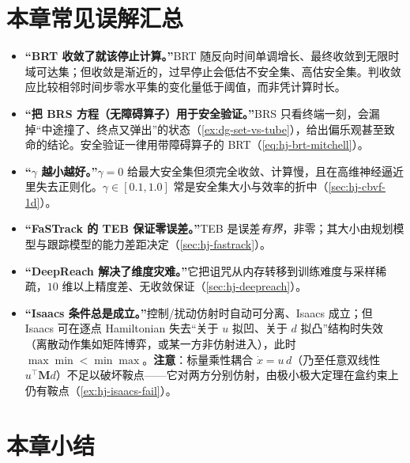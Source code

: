 \section*{本章常见误解汇总}

\begin{itemize}
  \item \textbf{“BRT 收敛了就该停止计算。”}\;BRT 随反向时间单调增长、最终收敛到无限时域可达集；但收敛是渐近的，过早停止会低估不安全集、高估安全集。判收敛应比较相邻时间步零水平集的变化量低于阈值，而非凭计算时长。
  \item \textbf{“把 BRS 方程（无障碍算子）用于安全验证。”}\;BRS 只看终端一刻，会漏掉“中途撞了、终点又弹出”的状态（\cref{ex:dg-set-vs-tube}），给出偏乐观甚至致命的结论。安全验证一律用带障碍算子的 BRT（\cref{eq:hj-brt-mitchell}）。
  \item \textbf{“$\gamma$ 越小越好。”}\;$\gamma=0$ 给最大安全集但须完全收敛、计算慢，且在高维神经逼近里失去正则化。$\gamma\in[0.1,1.0]$ 常是安全集大小与效率的折中（\cref{sec:hj-cbvf-1d}）。
  \item \textbf{“FaSTrack 的 TEB 保证零误差。”}\;TEB 是误差\emph{有界}，非零；其大小由规划模型与跟踪模型的能力差距决定（\cref{sec:hj-fastrack}）。
  \item \textbf{“DeepReach 解决了维度灾难。”}\;它把诅咒从内存转移到训练难度与采样稀疏，$10$ 维以上精度差、无收敛保证（\cref{sec:hj-deepreach}）。
  \item \textbf{“Isaacs 条件总是成立。”}\;控制/扰动仿射时自动可分离、Isaacs 成立；但 Isaacs 可在逐点 Hamiltonian 失去“关于 $u$ 拟凹、关于 $d$ 拟凸”结构时失效（离散动作集如矩阵博弈，或某一方非仿射进入），此时 $\max\min<\min\max$。\textbf{注意}：标量乘性耦合 $\dot x=u\,d$（乃至任意双线性 $u^\top\mathbf M d$）不足以破坏鞍点——它对两方分别仿射，由极小极大定理在盒约束上仍有鞍点（\cref{ex:hj-isaacs-fail}）。
\end{itemize}

\section*{本章小结}

